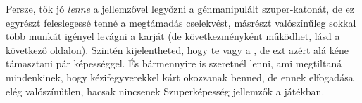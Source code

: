 Persze, tök jó \emph{lenne} a  jellemzővel legyőzni a génmanipulált szuper‑katonát, de ez egyrészt feleslegessé tenné a megtámadás cselekvést, másrészt valószínűleg sokkal több munkát igényel levágni a karját (de következményként működhet, lásd a következő oldalon). Szintén kijelentheted, hogy te vagy a , de ezt azért alá kéne támasztani pár képességgel. És bármennyire is szeretnél  lenni, ami megtiltaná mindenkinek, hogy kézifegyverekkel kárt okozzanak benned, de ennek elfogadása elég valószínűtlen, hacsak nincsenek Szuperképesség jellemzők a játékban.
